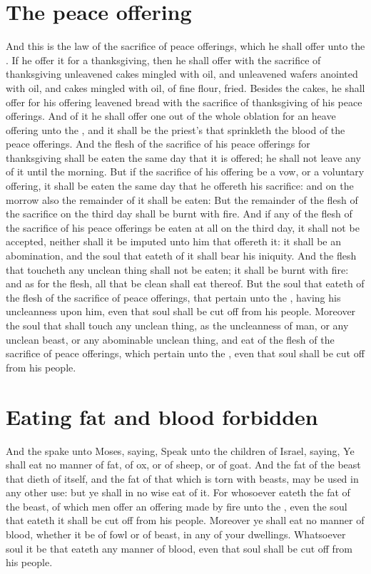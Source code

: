 \begin{biblechapter}
\section*{The peace offering}
\verse And this is the law of the sacrifice of peace offerings, which he shall offer unto the \LORD.
\verse If he offer it for a thanksgiving, then he shall offer with the sacrifice of thanksgiving unleavened cakes mingled with oil, and unleavened wafers anointed with oil, and cakes mingled with oil, of fine flour, fried.
\verse Besides the cakes, he shall offer for his offering leavened bread with the sacrifice of thanksgiving of his peace offerings.
\verse And of it he shall offer one out of the whole oblation for an heave offering unto the \LORD, and it shall be the priest's that sprinkleth the blood of the peace offerings.
\verse And the flesh of the sacrifice of his peace offerings for thanksgiving shall be eaten the same day that it is offered; he shall not leave any of it until the morning.
\verse But if the sacrifice of his offering be a vow, or a voluntary offering, it shall be eaten the same day that he offereth his sacrifice: and on the morrow also the remainder of it shall be eaten:
\verse But the remainder of the flesh of the sacrifice on the third day shall be burnt with fire.
\verse And if any of the flesh of the sacrifice of his peace offerings be eaten at all on the third day, it shall not be accepted, neither shall it be imputed unto him that offereth it: it shall be an abomination, and the soul that eateth of it shall bear his iniquity.
\verse And the flesh that toucheth any unclean thing shall not be eaten; it shall be burnt with fire: and as for the flesh, all that be clean shall eat thereof.
\verse But the soul that eateth of the flesh of the sacrifice of peace offerings, that pertain unto the \LORD, having his uncleanness upon him, even that soul shall be cut off from his people.
\verse Moreover the soul that shall touch any unclean thing, as the uncleanness of man, or any unclean beast, or any abominable unclean thing, and eat of the flesh of the sacrifice of peace offerings, which pertain unto the \LORD, even that soul shall be cut off from his people.
\section*{Eating fat and blood forbidden}
\verse And the \LORD spake unto Moses, saying,
\verse Speak unto the children of Israel, saying, Ye shall eat no manner of fat, of ox, or of sheep, or of goat.
\verse And the fat of the beast that dieth of itself, and the fat of that which is torn with beasts, may be used in any other use: but ye shall in no wise eat of it.
\verse For whosoever eateth the fat of the beast, of which men offer an offering made by fire unto the \LORD, even the soul that eateth it shall be cut off from his people.
\verse Moreover ye shall eat no manner of blood, whether it be of fowl or of beast, in any of your dwellings.
\verse Whatsoever soul it be that eateth any manner of blood, even that soul shall be cut off from his people.

\end{biblechapter}
